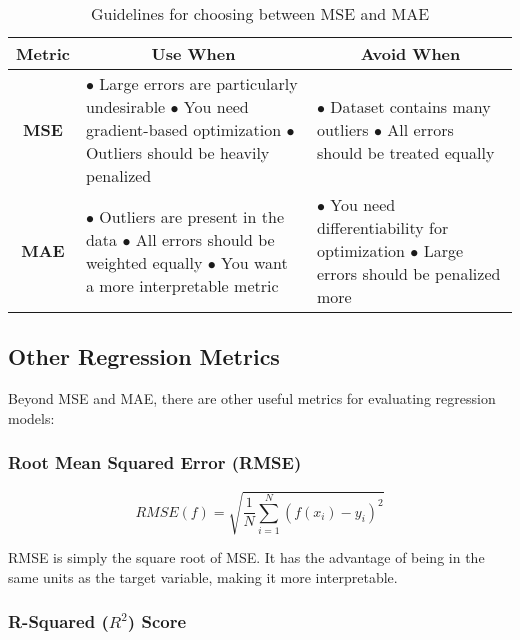 \documentclass[11pt,a4paper]{article}
\theoremstyle{definition}
\theoremstyle{plain}
\theoremstyle{remark}
\begin{document}
\begin{table}[h]
\centering
\begin{tabular}{|c|p{6cm}|p{6cm}|}
\hline
\textbf{Metric} & \multicolumn{1}{c|}{\textbf{Use When}} & \multicolumn{1}{c|}{\textbf{Avoid When}} \\
\hline
\textbf{MSE} & 
\raggedright
$\bullet$ Large errors are particularly undesirable\newline
$\bullet$ You need gradient-based optimization\newline
$\bullet$ Outliers should be heavily penalized
& 
\raggedright
$\bullet$ Dataset contains many outliers\newline
$\bullet$ All errors should be treated equally
\tabularnewline
\hline
\textbf{MAE} & 
\raggedright
$\bullet$ Outliers are present in the data\newline
$\bullet$ All errors should be weighted equally\newline
$\bullet$ You want a more interpretable metric
& 
\raggedright
$\bullet$ You need differentiability for optimization\newline
$\bullet$ Large errors should be penalized more
\tabularnewline
\hline
\end{tabular}
\caption{Guidelines for choosing between MSE and MAE}
\end{table}

\subsection{Other Regression Metrics}

Beyond MSE and MAE, there are other useful metrics for evaluating regression models:

\subsubsection{Root Mean Squared Error (RMSE)}

\begin{equation}
RMSE(f) = \sqrt{\frac{1}{N} \sum_{i=1}^{N} (f(x_i) - y_i)^2}
\end{equation}

RMSE is simply the square root of MSE. It has the advantage of being in the same units as the target variable, making it more interpretable.

\subsubsection{R-Squared ($R^2$) Score}
\end{document}
